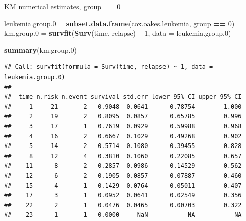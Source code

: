 \documentclass[ignorenonframetext,]{beamer}
\newenvironment{Shaded}{\begin{snugshade}}{\end{snugshade}}
\newcommand{\DataTypeTok}[1]{\textcolor[rgb]{0.13,0.29,0.53}{#1}}
\newcommand{\DecValTok}[1]{\textcolor[rgb]{0.00,0.00,0.81}{#1}}
\newcommand{\FloatTok}[1]{\textcolor[rgb]{0.00,0.00,0.81}{#1}}
\newcommand{\KeywordTok}[1]{\textcolor[rgb]{0.13,0.29,0.53}{\textbf{#1}}}
\newcommand{\NormalTok}[1]{#1}
\newcommand{\OperatorTok}[1]{\textcolor[rgb]{0.81,0.36,0.00}{\textbf{#1}}}
\newcommand{\StringTok}[1]{\textcolor[rgb]{0.31,0.60,0.02}{#1}}
\begin{document}
\begin{frame}[fragile]{%
\protect\hypertarget{km-numerical-estimates-group-0}{%
KM numerical estimates, group == 0}}

\scriptsize

\begin{Shaded}
\begin{Highlighting}[]
\NormalTok{leukemia.group}\FloatTok{.0}\NormalTok{ =}\StringTok{ }\KeywordTok{subset.data.frame}\NormalTok{(cox.oakes.leukemia, group }\OperatorTok{==}\StringTok{ }\DecValTok{0}\NormalTok{)}
\NormalTok{km.group}\FloatTok{.0}\NormalTok{ =}\StringTok{ }\KeywordTok{survfit}\NormalTok{(}\KeywordTok{Surv}\NormalTok{(time, relapse) }\OperatorTok{~}\StringTok{ }\DecValTok{1}\NormalTok{, }\DataTypeTok{data =}\NormalTok{ leukemia.group}\FloatTok{.0}\NormalTok{)}

\KeywordTok{summary}\NormalTok{(km.group}\FloatTok{.0}\NormalTok{)}
\end{Highlighting}
\end{Shaded}

\begin{verbatim}
## Call: survfit(formula = Surv(time, relapse) ~ 1, data = leukemia.group.0)
## 
##  time n.risk n.event survival std.err lower 95% CI upper 95% CI
##     1     21       2   0.9048  0.0641      0.78754        1.000
##     2     19       2   0.8095  0.0857      0.65785        0.996
##     3     17       1   0.7619  0.0929      0.59988        0.968
##     4     16       2   0.6667  0.1029      0.49268        0.902
##     5     14       2   0.5714  0.1080      0.39455        0.828
##     8     12       4   0.3810  0.1060      0.22085        0.657
##    11      8       2   0.2857  0.0986      0.14529        0.562
##    12      6       2   0.1905  0.0857      0.07887        0.460
##    15      4       1   0.1429  0.0764      0.05011        0.407
##    17      3       1   0.0952  0.0641      0.02549        0.356
##    22      2       1   0.0476  0.0465      0.00703        0.322
##    23      1       1   0.0000     NaN           NA           NA
\end{verbatim}

\end{frame}
\end{document}
